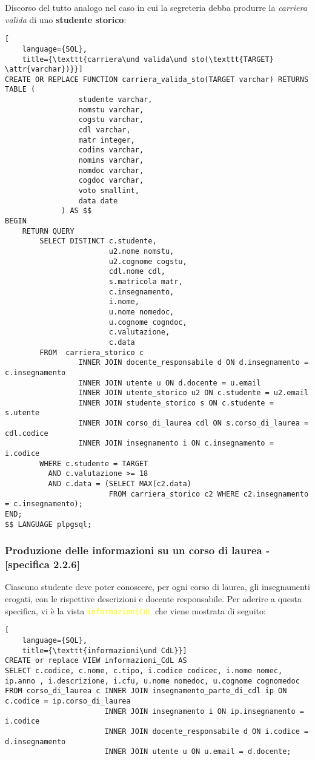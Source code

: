 \documentclass{article}
\newcommand{\attr}[1]{\texttt{\textcolor{gray}{#1}}}
\newcommand{\sqlview}[1]{\texttt{\textcolor{yellow}{#1}}}
\newcommand{\und}[0]{\textunderscore}
\begin{document}
Discorso del tutto analogo nel caso in cui la segreteria debba produrre la \textit{carriera valida} di uno \textbf{studente storico}:

\begin{lstlisting}[
    language={SQL},
    title={\texttt{carriera\und valida\und sto(\texttt{TARGET} \attr{varchar})}}]
CREATE OR REPLACE FUNCTION carriera_valida_sto(TARGET varchar) RETURNS TABLE (
                 studente varchar,
                 nomstu varchar,
                 cogstu varchar,
                 cdl varchar,
                 matr integer,
                 codins varchar,
                 nomins varchar,
                 nomdoc varchar,
                 cogdoc varchar,
                 voto smallint,
                 data date
             ) AS $$
BEGIN
    RETURN QUERY
        SELECT DISTINCT c.studente,
                        u2.nome nomstu,
                        u2.cognome cogstu,
                        cdl.nome cdl,
                        s.matricola matr,
                        c.insegnamento,
                        i.nome,
                        u.nome nomedoc,
                        u.cognome cogndoc,
                        c.valutazione,
                        c.data
        FROM  carriera_storico c
                 INNER JOIN docente_responsabile d ON d.insegnamento = c.insegnamento
                 INNER JOIN utente u ON d.docente = u.email
                 INNER JOIN utente_storico u2 ON c.studente = u2.email
                 INNER JOIN studente_storico s ON c.studente = s.utente
                 INNER JOIN corso_di_laurea cdl ON s.corso_di_laurea = cdl.codice
                 INNER JOIN insegnamento i ON c.insegnamento = i.codice
        WHERE c.studente = TARGET
          AND c.valutazione >= 18
          AND c.data = (SELECT MAX(c2.data)
                        FROM carriera_storico c2 WHERE c2.insegnamento = c.insegnamento);
END;
$$ LANGUAGE plpgsql;
\end{lstlisting}

\subsubsection{Produzione delle informazioni su un corso di laurea - [specifica 2.2.6]}
Ciascuno studente deve poter conoscere, per ogni corso di laurea, gli insegnamenti erogati, con le rispettive descrizioni e docente responsabile. Per aderire a questa specifica, vi è la vista \sqlview{informazioni\und CdL} che viene mostrata di seguito:
\begin{lstlisting}[
    language={SQL},
    title={\texttt{informazioni\und CdL}}]
CREATE or replace VIEW informazioni_CdL AS
SELECT c.codice, c.nome, c.tipo, i.codice codicec, i.nome nomec, ip.anno , i.descrizione, i.cfu, u.nome nomedoc, u.cognome cognomedoc
FROM corso_di_laurea c INNER JOIN insegnamento_parte_di_cdl ip ON c.codice = ip.corso_di_laurea
                       INNER JOIN insegnamento i ON ip.insegnamento = i.codice
                       INNER JOIN docente_responsabile d ON i.codice = d.insegnamento
                       INNER JOIN utente u ON u.email = d.docente;
\end{lstlisting}
\end{document}
